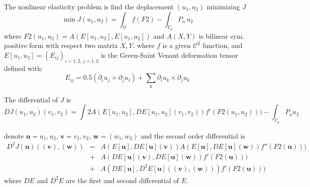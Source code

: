 \documentclass[twoside]{book}
\newif\ifpdf
\def\textBlack{\color{black}}
\begin{document}
\graphicspath{{./}{plots/}}
\ifpdf
\DeclareGraphicsExtensions{.pdf, .jpg, .tif}
\else
{}
\fi

\let\subsubsection\subsection
\let\subsection\section
\let\section\chapter




\textBlack
The nonlinear elasticity  problem is find  the deplacement $(u_{1},u_{2})$  minimizing  $J$
$$ \min J(u_{1},u_{2}) = \int_{\Omega} f(F2) -  \int_{\Gamma_{p}} P_{a} \,  u_{2} $$
where  $F2(u_{1},u_{2}) =  A(E[u_{1},u_{2}],E[u_{1},u_{2}])$ and $A(X,Y)$ is bilinear sym. positive form with respect two matrix $X,Y$.
where $f$ is a given $\mathcal{C}^2$  function, and $E[u_{1},u_{2}] = (E_{ij})_{i=1,2,\,j=1,2}$ is the Green-Saint Venant deformation tensor defined  with: 
$$  E_{ij} = 0.5 ( \partial_i u_j + \partial_j u_i ) + \sum_k \partial_i u_k \times \partial_j u_k  $$ 



The differential of $J$ is 
  $$ DJ(u_{1},u_{2})(v_{1},v_{2}) = \int 2 A(E[u_{1},u_{2}],DE[u_{1},u_{2}](v_{1},v_{2})) f'(F2(u_{1},u_{2}))) -  \int_{\Gamma_{p}} P_{a}  u_{2}  $$

denote $\mathbf{u}=u_{1},u_{2}$, $\mathbf{v}=v_{1},v_{2}$, $\mathbf{w}=(w_{1},w_{2})$ and  
the second order differential is
 {\begin{eqnarray*}
D^2 J(\mathbf{u})((\mathbf{v}),(\mathbf{w}))  &= & A(E[\mathbf{u}],DE[\mathbf{u}](\mathbf{v})) A(E[\mathbf{u}],DE[\mathbf{u}](\mathbf{w})) f''(F2(\mathbf{u}))) \\
 & + &  A(DE[\mathbf{u}](\mathbf{v}),DE[\mathbf{u}](\mathbf{w})) f'(F2(\mathbf{u}))) \\
 &+&  A(DE[\mathbf{u}],D^{2}E[\mathbf{u}]((\mathbf{v}),(\mathbf{w}))) f'(F2(\mathbf{u}))) 
\end{eqnarray*}}
 where $DE$ and $D^{2}E$ are the first and second differential of $E$.
 
\end{document}
